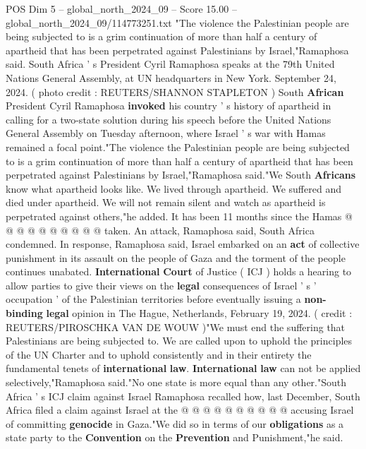 \begin{textsample}{POS Dim 5 – global\_north\_2024\_09 – Score 15.00 – global\_north\_2024\_09/114773251.txt}  \label{ex:f5_pos_314}
"The violence the Palestinian people are being subjected to is a grim continuation of more than half a century of apartheid that has been perpetrated against Palestinians by Israel,"Ramaphosa said.
South Africa ' s President Cyril Ramaphosa speaks at the 79th United Nations General Assembly, at UN headquarters in New York.
September 24, 2024. ( photo credit : REUTERS/SHANNON STAPLETON ) South \textbf{African} President Cyril Ramaphosa \textbf{invoked} his country ' s history of apartheid in calling for a two-state solution during his speech before the United Nations General Assembly on Tuesday afternoon, where Israel ' s war with Hamas remained a focal point."The violence the Palestinian people are being subjected to is a grim continuation of more than half a century of apartheid that has been perpetrated against Palestinians by Israel,"Ramaphosa said."We South \textbf{Africans} know what apartheid looks like.
We lived through apartheid.
We suffered and died under apartheid.
We will not remain silent and watch as apartheid is perpetrated against others,"he added.
It has been 11 months since the Hamas @ @ @ @ @ @ @ @ @ @ taken.
An attack, Ramaphosa said, South Africa condemned.
In response, Ramaphosa said, Israel embarked on an \textbf{act} of collective punishment in its assault on the people of Gaza and the torment of the people continues unabated. \textbf{International} \textbf{Court} of Justice ( ICJ ) holds a hearing to allow parties to give their views on the \textbf{legal} consequences of Israel ' s ' occupation ' of the Palestinian territories before eventually issuing a \textbf{non-binding} \textbf{legal} opinion in The Hague, Netherlands, February 19, 2024. ( credit : REUTERS/PIROSCHKA VAN DE WOUW )"We must end the suffering that Palestinians are being subjected to.
We are called upon to uphold the principles of the UN Charter and to uphold consistently and in their entirety the fundamental tenets of \textbf{international} \textbf{law}. \textbf{International} \textbf{law} can not be applied selectively,"Ramaphosa said."No one state is more equal than any other."South Africa ' s ICJ claim against Israel Ramaphosa recalled how, last December, South Africa filed a claim against Israel at the @ @ @ @ @ @ @ @ @ @ accusing Israel of committing \textbf{genocide} in Gaza."We did so in terms of our \textbf{obligations} as a state party to the \textbf{Convention} on the \textbf{Prevention} and Punishment,"he said.

\end{textsample}
